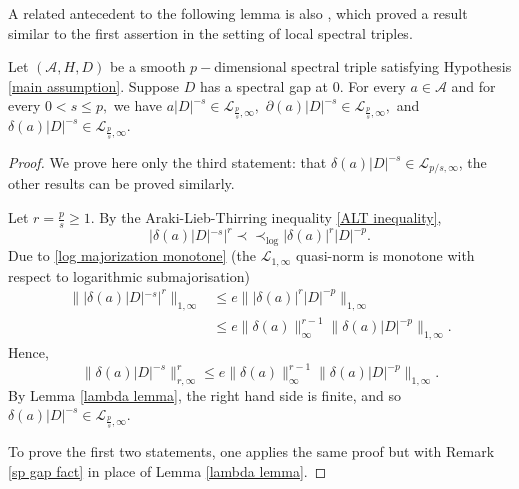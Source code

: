     A related antecedent to the following lemma is also \cite[Proposition 10]{Rennie-2004}, which proved a result similar to the first assertion in the setting of local spectral triples.
    
    \begin{lem}\label{z<p lemma} 
        Let $(\mathcal{A},H,D)$ be a smooth $p-$dimensional spectral triple satisfying Hypothesis \ref{main assumption}. 
        Suppose $D$ has a spectral gap at $0.$ For every $a\in\mathcal{A}$ and for every $0 < s\leq p,$ we have 
        $a|D|^{-s}\in\mathcal{L}_{\frac{p}{s},\infty},$ $\partial(a)|D|^{-s}\in\mathcal{L}_{\frac{p}{s},\infty},$ and $\delta(a)|D|^{-s}\in\mathcal{L}_{\frac{p}{s},\infty}.$
    \end{lem}
    \begin{proof} 
        We prove here only the third statement: that $\delta(a)|D|^{-s} \in \mathcal{L}_{p/s,\infty}$, the other results can be proved similarly.
        
        Let $r = \frac{p}{s} \geq 1$. By the Araki-Lieb-Thirring inequality \eqref{ALT inequality},
        \begin{equation*}
            |\delta(a)|D|^{-s}|^{r} \prec\prec_{\log} |\delta(a)|^r|D|^{-p}.
        \end{equation*}
        Due to \eqref{log majorization monotone} (the $\mathcal{L}_{1,\infty}$ quasi-norm is monotone with respect to logarithmic submajorisation)
        \begin{align*}
            \||\delta(a)|D|^{-s}|^r\|_{1,\infty} &\leq e\||\delta(a)|^r|D|^{-p}\|_{1,\infty}\\
                                                 &\leq e\|\delta(a)\|_\infty^{r-1}\|\delta(a)|D|^{-p}\|_{1,\infty}.
        \end{align*}
        Hence,
        \begin{equation*}
            \|\delta(a)|D|^{-s}\|_{r,\infty}^r \leq e\|\delta(a)\|_{\infty}^{r-1}\|\delta(a)|D|^{-p}\|_{1,\infty}.
        \end{equation*}
        By Lemma \ref{lambda lemma}, the right hand side is finite, and so $\delta(a)|D|^{-s} \in \mathcal{L}_{\frac{p}{s},\infty}$. 
        
        To prove the first two statements, one applies the same proof but with Remark \ref{sp gap fact} in place of Lemma \ref{lambda lemma}.
    \end{proof}
    
